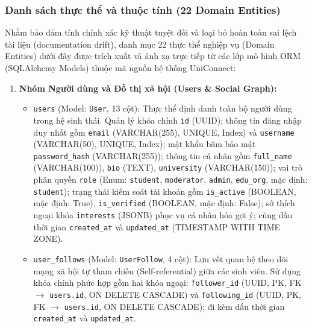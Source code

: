 \subsubsection{Danh sách thực thể và thuộc tính (22 Domain Entities)}

Nhằm bảo đảm tính chính xác kỹ thuật tuyệt đối và loại bỏ hoàn toàn sai lệch tài liệu (documentation drift), danh mục 22 thực thể nghiệp vụ (Domain Entities) dưới đây được trích xuất và ánh xạ trực tiếp từ các lớp mô hình ORM (SQLAlchemy Models) thuộc mã nguồn hệ thống UniConnect:

\begin{enumerate}
    \item \textbf{Nhóm Người dùng và Đồ thị xã hội (Users \& Social Graph):}
    \begin{itemize}
        \item \texttt{users} (Model: \texttt{User}, 13 cột): Thực thể định danh toàn bộ người dùng trong hệ sinh thái. Quản lý khóa chính \texttt{id} (UUID); thông tin đăng nhập duy nhất gồm \texttt{email} (VARCHAR(255), UNIQUE, Index) và \texttt{username} (VARCHAR(50), UNIQUE, Index); mật khẩu băm bảo mật \texttt{password\_hash} (VARCHAR(255)); thông tin cá nhân gồm \texttt{full\_name} (VARCHAR(100)), \texttt{bio} (TEXT), \texttt{university} (VARCHAR(150)); vai trò phân quyền \texttt{role} (Enum: \texttt{student}, \texttt{moderator}, \texttt{admin}, \texttt{edu\_org}, mặc định: \texttt{student}); trạng thái kiểm soát tài khoản gồm \texttt{is\_active} (BOOLEAN, mặc định: True), \texttt{is\_verified} (BOOLEAN, mặc định: False); sở thích ngoại khóa \texttt{interests} (JSONB) phục vụ cá nhân hóa gợi ý; cùng dấu thời gian \texttt{created\_at} và \texttt{updated\_at} (TIMESTAMP WITH TIME ZONE).
        \item \texttt{user\_follows} (Model: \texttt{UserFollow}, 4 cột): Lưu vết quan hệ theo dõi mạng xã hội tự tham chiếu (Self-referential) giữa các sinh viên. Sử dụng khóa chính phức hợp gồm hai khóa ngoại: \texttt{follower\_id} (UUID, PK, FK $\rightarrow$ \texttt{users.id}, ON DELETE CASCADE) và \texttt{following\_id} (UUID, PK, FK $\rightarrow$ \texttt{users.id}, ON DELETE CASCADE); đi kèm dấu thời gian \texttt{created\_at} và \texttt{updated\_at}.
    \end{itemize}


\end{enumerate}

